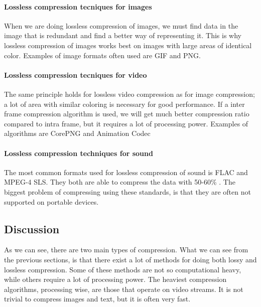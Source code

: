 \paragraph{Lossless compression tecniques for images}  \hfill \newline
When we are doing lossless compression of images, we must find data in the image that is redundant and find a better way of representing it. This is why lossless compression of images works best on images with large areas of identical color. Examples of image formats often used are GIF and PNG. \cite{bib:GIF} \cite{bib:gifsicle} \cite{bib:PNG}

\paragraph{Lossless compression tecniques for video}  \hfill \newline
The same principle holds for lossless video compression as for image compression; a lot of area with similar coloring is necessary for good performance. If a inter frame compression algorithm is used, we will get much better compression ratio compared to intra frame, but it requires a lot of processing power. Examples of algorithms are CorePNG and Animation Codec \cite{bib:corePNG} \cite{bib:animationcodec}

\newpage

\paragraph{Lossless compression techniques for sound}
The most common formats used for lossless compression of sound is FLAC and MPEG-4 SLS. They both are able to compress the data with 50-60\% . The biggest problem of compressing using these standards, is that they are often not supported on portable devices.  \cite{bib:FLAC}


\subsection{Discussion}
As we can see, there are two main types of compression. What we can see from the previous sections, is that there exist a lot of methods for doing both lossy and lossless compression. Some of these methods are not so computational heavy, while others require a lot of processing power. The heaviest compression algorithms, processing wise, are those that operate on video streams. It is not trivial to compress images and text, but it is often very fast.

